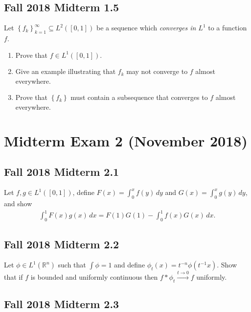 \hypertarget{fall-2018-midterm-1.5}{%
\subsection{Fall 2018 Midterm 1.5}\label{fall-2018-midterm-1.5}}

Let \(\left\{{ f_k }\right\}_{k=1}^{\infty } \subseteq L^2([0, 1])\) be
a sequence which \emph{converges in \(L^1\)} to a function \(f\).

\begin{enumerate}
\def\labelenumi{\alph{enumi}.}
\item
  Prove that \(f\in L^1([0, 1])\).
\item
  Give an example illustrating that \(f_k\) may not converge to \(f\)
  almost everywhere.
\item
  Prove that \(\left\{{f_k}\right\}\) must contain a subsequence that
  converges to \(f\) almost everywhere.
\end{enumerate}

\hypertarget{midterm-exam-2-november-2018}{%
\section{Midterm Exam 2 (November
2018)}\label{midterm-exam-2-november-2018}}

\hypertarget{fall-2018-midterm-2.1}{%
\subsection{Fall 2018 Midterm 2.1}\label{fall-2018-midterm-2.1}}

Let \(f, g\in L^1([0, 1])\), define \(F(x) = \int_0^x f(y)\,dy\) and
\(G(x) = \int_0^x g(y)\,dy\), and show
\begin{align*}
\int_0^1 F(x)g(x) \,dx = F(1)G(1) - \int_0^1 f(x) G(x) \, dx
.\end{align*}

\hypertarget{fall-2018-midterm-2.2}{%
\subsection{Fall 2018 Midterm 2.2}\label{fall-2018-midterm-2.2}}

Let \(\phi\in L^1({\mathbb{R}}^n)\) such that \(\int \phi = 1\) and
define \(\phi_t(x) = t^{-n}\phi(t^{-1}x)\). Show that if \(f\) is
bounded and uniformly continuous then
\(f\ast \phi_t \overset{t\to 0}\to f\) uniformly.

\hypertarget{fall-2018-midterm-2.3}{%
\subsection{Fall 2018 Midterm 2.3}\label{fall-2018-midterm-2.3}}

